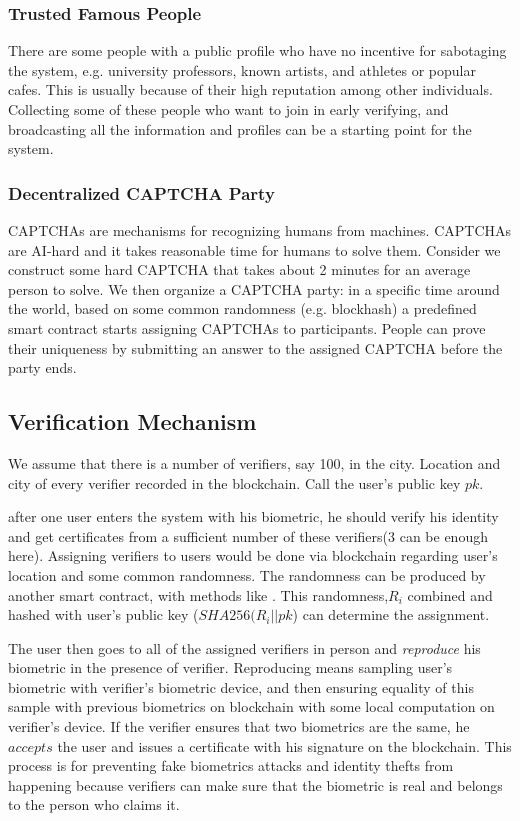 \documentclass[conference]{IEEEtran}
\begin{document}
\subsubsection*{Trusted Famous People}
There are some people with a public profile who have no incentive for sabotaging the system, e.g. university professors, known artists, and athletes or popular cafes. This is usually because of their high reputation among other individuals. Collecting some of these people who want to join in early verifying, and broadcasting all the information and profiles can be a starting point for the system.

\subsubsection*{Decentralized CAPTCHA Party}
CAPTCHAs \cite{CAPTCHA} are mechanisms for recognizing humans from machines. CAPTCHAs are AI-hard and it takes reasonable time for humans to solve them. Consider we construct some hard CAPTCHA that takes about 2 minutes for an average person to solve. We then organize a CAPTCHA party: in a specific time around the world, based on some common randomness (e.g. blockhash) a predefined smart contract starts assigning CAPTCHAs to participants. People can prove their uniqueness by submitting an answer to the assigned CAPTCHA before the party ends.

\subsection{Verification Mechanism}
We assume that there is a number of verifiers, say 100, in the city. Location and city of every verifier recorded in the blockchain. Call the user's public key $pk$.


 after one user enters the system with his biometric, he should verify his identity and get certificates from a sufficient number of these verifiers(3 can be enough here). Assigning verifiers to users would be done via blockchain regarding user's location and some common randomness. The randomness can be produced by another smart contract, with methods like  \cite{rhound}. %
  This randomness,$ R_i$ combined and hashed with user's public key ($SHA256(R_i || pk$) can determine the assignment. 
 
 
The user then goes to all of the assigned verifiers in person and \textit{reproduce}  his biometric in the presence of verifier. Reproducing means sampling user's biometric with verifier's biometric device, and then ensuring equality of this sample with previous biometrics on blockchain with some local computation on verifier's device. If the verifier ensures that two biometrics are the same, he $accepts$ the user and issues a certificate with his signature on the blockchain. This process is for preventing fake biometrics attacks and identity thefts from happening because verifiers can make sure that the biometric is real and belongs to the person who claims it. 
\end{document}
